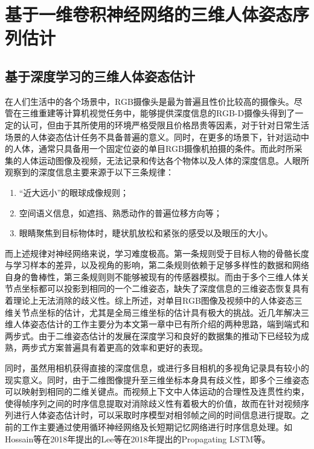
\chapter{基于一维卷积神经网络的三维人体姿态序列估计}


\section{基于深度学习的三维人体姿态估计}


在人们生活中的各个场景中，RGB摄像头是最为普遍且性价比较高的摄像头。尽管在三维重建等计算机视觉任务中，能够提供深度信息的RGB-D摄像头得到了一定的认可，但由于其所使用的环境严格受限且价格昂贵等因素，对于针对日常生活场景的人体姿态估计任务不具备普遍的意义。同时，在更多的场景下，针对运动中的人体，通常只具备用一个固定位姿的单目RGB摄像机拍摄的条件。而此时所采集的人体运动图像及视频，无法记录和传达各个物体以及人体的深度信息。人眼所观察到的深度信息主要来源于以下三条规律：

\begin{enumerate}
    \item “近大远小”的眼球成像规则；
    \item 空间语义信息，如遮挡、熟悉动作的普遍位移方向等；
    \item 眼睛聚焦到目标物体时，睫状肌放松和紧张的感受以及眼压的大小。
\end{enumerate}

而上述规律对神经网络来说，学习难度极高。第一条规则受于目标人物的骨骼长度与学习样本的差异，以及视角的影响，第二条规则依赖于足够多样性的数据和网络自身的鲁棒性，第三条规则则不能够被现有的传感器模拟。而由于多个三维人体关节点坐标都可以投影到相同的一个二维姿态，缺失了深度信息的三维姿态恢复具有着理论上无法消除的歧义性。综上所述，对单目RGB图像及视频中的人体姿态三维关节点坐标的估计，尤其是全局三维坐标的估计具有极大的挑战。近几年解决三维人体姿态估计的工作主要分为本文第一章中已有所介绍的两种思路，端到端式和两步式。由于二维姿态估计的发展在深度学习和良好的数据集的推动下已经较为成熟，两步式方案普遍具有着更高的效率和更好的表现。

同时，虽然用相机获得直接的深度信息，或进行多目相机的多视角记录具有较小的现实意义。同时，由于二维图像提升至三维坐标本身具有歧义性，即多个三维姿态可以映射到相同的二维关键点。而视频上下文中人体运动的合理性及连贯性约束，使得帧序列之间的时序信息提取对消除歧义性有着极大的价值，故而在针对视频序列进行人体姿态估计时，可以采取时序模型对相邻帧之间的时间信息进行提取。之前的工作主要通过使用循环神经网络及长短期记忆网络进行时序信息处理。如Hossain等在2018年提出的Lee等在2018年提出的Propagating LSTM等。


